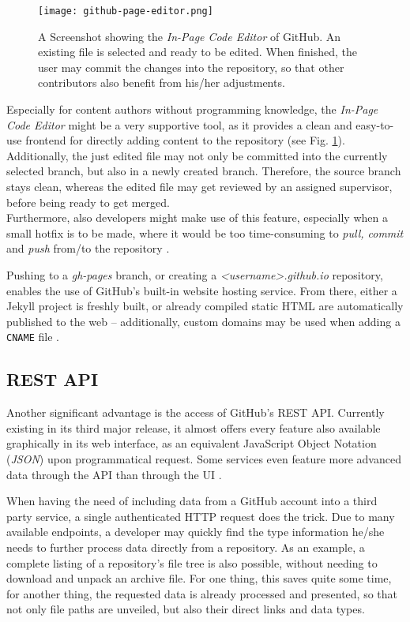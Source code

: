 \begin{figure} %
    \centering
    \texttt{[image: github-page-editor.png]}
    \caption{A Screenshot showing the \emph{In-Page Code Editor} of GitHub. An existing file is selected and ready to be edited. When finished, the user may commit the changes into the repository, so that other contributors also benefit from his/her adjustments.}
    \label{fig:github-page-editor}
\end{figure}
%

Especially for content authors without programming knowledge, the \emph{In-Page Code Editor} might be a very supportive tool, as it provides a clean and easy-to-use frontend for directly adding content to the repository (see Fig. \ref{fig:github-page-editor}). Additionally, the just edited file may not only be committed into the currently selected branch, but also in a newly created branch. Therefore, the source branch stays clean, whereas the edited file may get reviewed by an assigned supervisor, before being ready to get merged.\\
Furthermore, also developers might make use of this feature, especially when a small hotfix is to be made, where it would be too time-consuming to \emph{pull, commit} and \emph{push} from/to the repository \cite[405]{loeliger2012version}.

Pushing to a \emph{gh-pages} branch, or creating a \emph{<username>.github.io} repository, enables the use of GitHub's built-in website hosting service. From there, either a Jekyll project is freshly built, or already compiled static HTML are automatically published to the web -- additionally, custom domains may be used when adding a \texttt{CNAME} file \cite[p. 171f]{dhillon2016}.

\subsection{REST API}
Another significant advantage is the access of GitHub's REST API. Currently existing in its third major release, it almost offers every feature also available graphically in its web interface, as an equivalent JavaScript Object Notation (\emph{JSON}) upon programmatical request. Some services even feature more advanced data through the API than through the UI \cite[410]{loeliger2012version}.

When having the need of including data from a GitHub account into a third party service, a single authenticated HTTP request does the trick. Due to many available endpoints, a developer may quickly find the type information he/she needs to further process data directly from a repository. As an example, a complete listing of a repository's file tree is also possible, without needing to download and unpack an archive file. For one thing, this saves quite some time, for another thing, the requested data is already processed and presented, so that not only file paths are unveiled, but also their direct links and data types.

